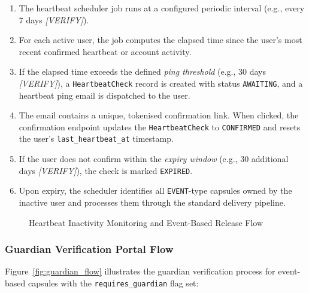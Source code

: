 \documentclass[12pt, a4paper]{article}
\begin{document}
\begin{enumerate}
  \item The heartbeat scheduler job runs at a configured periodic interval (e.g., every 7 days \textit{[VERIFY]}).
  \item For each active user, the job computes the elapsed time since the user's most recent confirmed heartbeat or account activity.
  \item If the elapsed time exceeds the defined \textit{ping threshold} (e.g., 30 days \textit{[VERIFY]}), a \texttt{HeartbeatCheck} record is created with status \texttt{AWAITING}, and a heartbeat ping email is dispatched to the user.
  \item The email contains a unique, tokenised confirmation link. When clicked, the confirmation endpoint updates the \texttt{HeartbeatCheck} to \texttt{CONFIRMED} and resets the user's \texttt{last\_heartbeat\_at} timestamp.
  \item If the user does not confirm within the \textit{expiry window} (e.g., 30 additional days \textit{[VERIFY]}), the check is marked \texttt{EXPIRED}.
  \item Upon expiry, the scheduler identifies all \texttt{EVENT}-type capsules owned by the inactive user and processes them through the standard delivery pipeline.
\end{enumerate}

\begin{figure}[H]
  \centering
  \caption{Heartbeat Inactivity Monitoring and Event-Based Release Flow}
  \label{fig:heartbeat_flow}
\end{figure}

\subsubsection{Guardian Verification Portal Flow}

Figure~\ref{fig:guardian_flow} illustrates the guardian verification process for event-based capsules with the \texttt{requires\_guardian} flag set:
\end{document}
